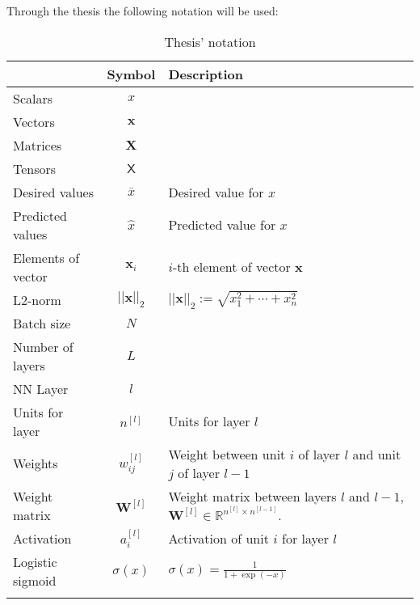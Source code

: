 
{}

Through the thesis the following notation will be used:


\renewcommand*{\arraystretch}{2}
\begin{longtable}{l|c|p{6cm}}
    & \textbf{Symbol} & \textbf{Description} \\
  \hline\hline
  \endhead
  
  Scalars & \( x \) & \\
  Vectors & \( \bm{x} \) & \\
  Matrices & \(\bm{X}\) & \\
  Tensors & \( \bm{\mathsf{X}} \) & \\
  Desired values & \( \bar{x} \) & Desired value for \( x \) \\
  Predicted values & \( \hat{x} \) & Predicted value for \( x \) \\
  Elements of vector & \( \bm{x}_i \) & \( i \)-th element of vector \( \bm{x} \) \\
  L2-norm & \( ||\bm{x}||_2 \) &  \( ||\bm{x}||_2 := \sqrt{x_1^2 + \cdots + x_n^2} \) \\
  \hline
  Batch size & \( N \) & \\
  Number of layers & \( L \) & \\
  NN Layer & \( l \) & \\
  Units for layer & \( n^{[l]} \) & Units for layer \( l \) \\
  Weights & \( w_{ij}^{[l]} \) & Weight between unit \( i \) of layer \( l \) and unit
  \( j \) of layer \( l - 1 \) \\
  Weight matrix & \( \bm{W}^{[l]} \) & Weight 
  matrix between layers \( l \) and \( l - 1 \), 
  \( \bm{W}^{[l]} \in \mathbb{R}^{n^{[l]} \times n^{[l - 1]}} \). \\
  Activation & \( a_i^{[l]} \) & Activation of unit \( i \) for layer \( l \) \\
  Logistic sigmoid & \( \sigma(x) \) & \( \sigma(x) = \frac{1}{1 + \exp(-x)} \) \\
  \caption{Thesis' notation}
\end{longtable}


